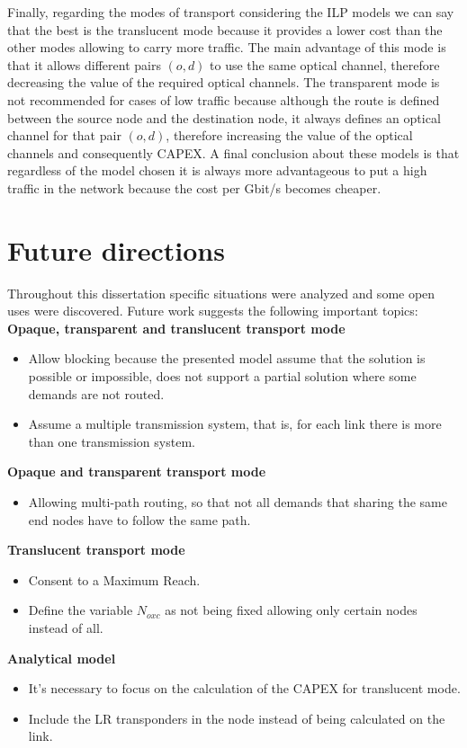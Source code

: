 Finally, regarding the modes of transport considering the ILP models we can say that the best is the translucent mode because it provides a lower cost than the other modes allowing to carry more traffic. The main advantage of this mode is that it allows different pairs $(o,d)$ to use the same optical channel, therefore decreasing the value of the required optical channels. The transparent mode is not recommended for cases of low traffic because although the route is defined between the source node and the destination node, it always defines an optical channel for that pair $(o,d)$, therefore increasing the value of the optical channels and consequently CAPEX. A final conclusion about these models is that regardless of the model chosen it is always more advantageous to put a high traffic in the network because the cost per Gbit/s becomes cheaper.

\section{Future directions}
\label{future}

Throughout this dissertation specific situations were analyzed and some open uses were discovered. Future work suggests the following important topics:\\

\textbf{Opaque, transparent and translucent transport mode}
\begin{itemize}
  \item Allow blocking because the presented model assume that the solution is possible or impossible, does not support a partial solution where some demands are not routed.
  \item Assume a multiple transmission system, that is, for each link there is more than one transmission system.
\end{itemize}

\textbf{Opaque and transparent transport mode}
\begin{itemize}
  \item Allowing multi-path routing, so that not all demands that sharing the same end nodes have to follow the same path.
\end{itemize}

\textbf{Translucent transport mode}
\begin{itemize}
  \item Consent to a Maximum Reach.
  \item Define the variable $N_{oxc}$ as not being fixed allowing only certain nodes instead of all.
\end{itemize}

\textbf{Analytical model}
\begin{itemize}
  \item It's necessary to focus on the calculation of the CAPEX for translucent mode.
  \item Include the LR transponders in the node instead of being calculated on the link.
\end{itemize}

